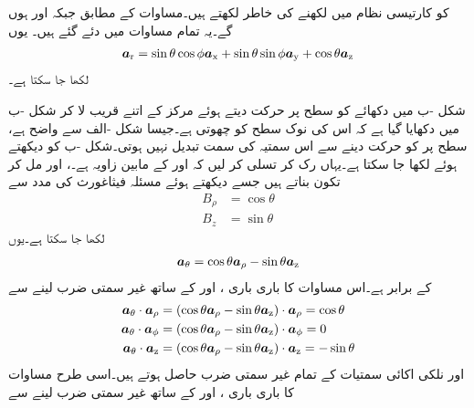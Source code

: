  کو کارتیسی نظام میں لکھنے کی خاطر  لکھتے ہیں۔مساوات  کے مطابق  جبکہ  اور  ہوں گے۔یہ تمام  مساوات  میں دئے گئے ہیں۔ یوں
\begin{align}
{\boldsymbol{a}}_{\textup{r}}=\sin \theta \cos \phi {\boldsymbol{a}}_{\textup{x}}+\sin \theta \sin \phi {\boldsymbol{a}}_{\textup{y}}+\cos \theta {\boldsymbol{a}}_{\textup{z}}
\end{align}
لکھا جا سکتا ہے۔

شکل -ب میں دکھائے  کو  سطح پر حرکت دیتے ہوئے  مرکز کے اتنے قریب لا کر شکل -ب میں دکھایا گیا ہے کہ اس کی نوک  سطح کو چھوتی ہے۔جیسا شکل -الف سے واضح ہے،   سطح پر  کو حرکت دینے سے اس سمتیہ کی سمت تبدیل نہیں ہوتی۔شکل -ب کو دیکھتے ہوئے  لکھا جا سکتا ہے۔یہاں رک کر  تسلی کر لیں کہ  اور  کے مابین زاویہ  ہے۔،  اور  مل کر تکون بناتے ہیں جسے دیکھتے ہوئے مسئلہ فیثاغورث کی مدد سے
\begin{align*}
B_\rho&=\cos \theta\\
B_z&=\sin \theta
\end{align*}
لکھا جا سکتا ہے۔یوں
\begin{align}\label{مساوات_سمتیہ_کروی_اکائی_تھیٹا}
{\boldsymbol{a}}_{\theta}=\cos \theta {\boldsymbol{a}}_{\rho}-\sin \theta {\boldsymbol{a}}_{\textup{z}}
\end{align}
کے برابر ہے۔اس مساوات کا باری باری ،  اور  کے ساتھ غیر سمتی ضرب لینے سے
\begin{gather}
\begin{aligned}\label{مساوات_سمتیہ_کروی_تھیٹا_نلکی_اکائی_غیر_سمتی_ضرب}
{\boldsymbol{a}}_{\theta} \cdot {\boldsymbol{a}}_{\rho}&=(\cos \theta {\boldsymbol{a}}_{\rho}-\sin \theta {\boldsymbol{a}}_{\textup{z}}) \cdot {\boldsymbol{a}}_{\rho}=\cos \theta\\
{\boldsymbol{a}}_{\theta} \cdot {\boldsymbol{a}}_{\phi}&=(\cos \theta {\boldsymbol{a}}_{\rho}-\sin \theta {\boldsymbol{a}}_{\textup{z}}) \cdot {\boldsymbol{a}}_{\phi}=0\\
{\boldsymbol{a}}_{\theta} \cdot {\boldsymbol{a}}_{\textup{z}}&=(\cos \theta {\boldsymbol{a}}_{\rho}-\sin \theta {\boldsymbol{a}}_{\textup{z}}) \cdot {\boldsymbol{a}}_{\textup{z}}=-\sin \theta
\end{aligned}
\end{gather}
 اور نلکی اکائی سمتیات کے  تمام غیر سمتی ضرب حاصل ہوتے ہیں۔اسی طرح مساوات  کا باری باری ،  اور  کے ساتھ غیر سمتی ضرب لینے سے
